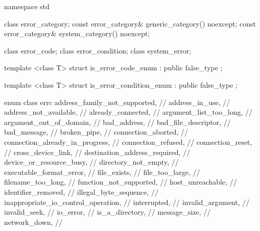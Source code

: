 \begin{codeblock}
namespace std {
  class error_category;
  const error_category& generic_category() noexcept;
  const error_category& system_category() noexcept;

  class error_code;
  class error_condition;
  class system_error;

  template <class T>
  struct is_error_code_enum : public false_type {};

  template <class T>
  struct is_error_condition_enum : public false_type {};

  enum class errc {
    address_family_not_supported,       // 
    address_in_use,                     // 
    address_not_available,              // 
    already_connected,                  // 
    argument_list_too_long,             // 
    argument_out_of_domain,             // 
    bad_address,                        // 
    bad_file_descriptor,                // 
    bad_message,                        // 
    broken_pipe,                        // 
    connection_aborted,                 // 
    connection_already_in_progress,     // 
    connection_refused,                 // 
    connection_reset,                   // 
    cross_device_link,                  // 
    destination_address_required,       // 
    device_or_resource_busy,            // 
    directory_not_empty,                // 
    executable_format_error,            // 
    file_exists,                        // 
    file_too_large,                     // 
    filename_too_long,                  // 
    function_not_supported,             // 
    host_unreachable,                   // 
    identifier_removed,                 // 
    illegal_byte_sequence,              // 
    inappropriate_io_control_operation, // 
    interrupted,                        // 
    invalid_argument,                   // 
    invalid_seek,                       // 
    io_error,                           // 
    is_a_directory,                     // 
    message_size,                       // 
    network_down,                       // 
}}
\end{codeblock}
